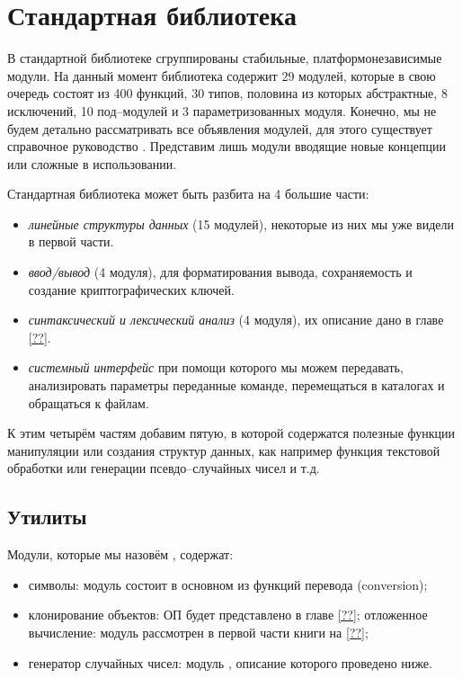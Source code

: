 \section{Стандартная библиотека}
\label{sec:standard_library}

 В стандартной библиотеке сгруппированы стабильные, платформонезависимые модули. 
На данный момент библиотека содержит 29 модулей, которые в свою очередь состоят 
из 400 функций, 30 типов, половина из которых абстрактные, 8 исключений, 10 
под–модулей и 3 параметризованных модуля. Конечно, мы не будем детально 
рассматривать все объявления модулей, для этого существует справочное 
руководство \cite{??}. Представим лишь модули вводящие новые концепции или 
сложные в использовании.

Стандартная библиотека может быть разбита на 4 большие части:

\begin{itemize}
	\item {\it линейные структуры данных} (15 модулей), некоторые из них мы уже 
видели в первой части.

	\item {\it ввод/вывод} (4 модуля), для форматирования вывода, сохраняемость 
и создание криптографических ключей.

	\item {\it синтаксический и лексический анализ} (4 модуля), их описание 
дано в главе \ref{??}.

	\item {\it системный интерфейс} при помощи которого мы можем передавать, 
анализировать параметры переданные команде, перемещаться в каталогах и 
обращаться к файлам.
\end{itemize}

К этим четырём частям добавим пятую, в которой содержатся полезные функции 
манипуляции или создания структур данных, как например функция текстовой 
обработки или генерации псевдо--случайных чисел и т.д.

\subsection{Утилиты}
\label{subsec:utilities}

Модули, которые мы назовём , содержат:

\begin{itemize}
	\item символы: модуль  состоит в основном из функций перевода 
(conversion);

	\item клонирование объектов: ОП будет представлено в главе \ref{??}; 
отложенное вычисление: модуль  рассмотрен в первой части книги на 
\ref{??};

	\item генератор случайных чисел: модуль , описание которого 
проведено ниже.
\end{itemize}

